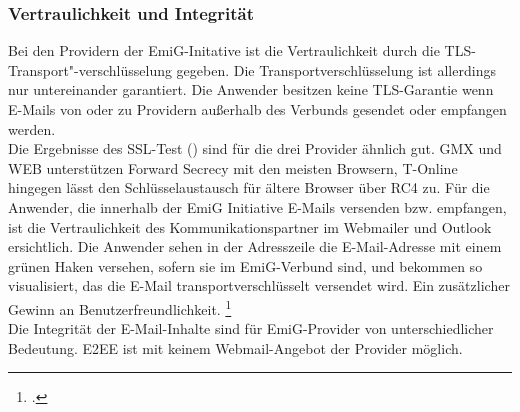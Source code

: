 \documentclass  [paper=a4,
				fontsize=12pt,
				listof=totoc,
				bibliography=totoc
				]{scrreprt}
\begin{document}
		\subsubsection{Vertraulichkeit und Integrität}		
			Bei den Providern der EmiG-Initative ist die Vertraulichkeit durch die TLS-Transport"-verschlüsselung gegeben. 
			Die Transportverschlüsselung ist allerdings nur untereinander garantiert. 
			Die Anwender besitzen keine \ac{TLS}-Garantie wenn E-Mails von oder zu Providern außerhalb des Verbunds gesendet oder empfangen werden.\\

			Die Ergebnisse des \ac{SSL}-Test () sind für die drei Provider ähnlich gut. GMX und WEB unterstützen Forward Secrecy mit den meisten Browsern, T-Online hingegen lässt den Schlüsselaustausch für ältere Browser über RC4 zu.
			Für die Anwender, die innerhalb der EmiG Initiative E-Mails versenden bzw. empfangen, ist die Vertraulichkeit des Kommunikationspartner im Webmailer und Outlook ersichtlich.
			Die Anwender sehen in der Adresszeile die E-Mail-Adresse mit einem grünen Haken versehen, sofern sie im \ac{EmiG}-Verbund sind, und bekommen so visualisiert, das die E-Mail transportverschlüsselt versendet wird. Ein zusätzlicher Gewinn an Benutzerfreundlichkeit.
			\footcite[Vgl.][]{Zivadino14a}\medskip\\
			Die Integrität der E-Mail-Inhalte sind für \ac{EmiG}-Provider von unterschiedlicher Bedeutung.
			\ac{E2EE} ist mit keinem Webmail-Angebot der Provider möglich.
\end{document}
